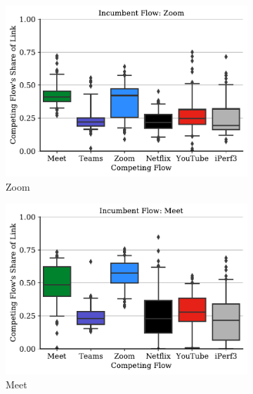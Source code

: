 \begin{figure}[t!]
\centering
\begin{subfigure}[t]{.33\textwidth}
    \centering
    \includegraphics[width=1\textwidth]{figures/comp/box_plot_zoom_dl_0.5.pdf}
    \caption{Zoom}
    \label{fig:zoom_box_1}
\end{subfigure}\hfill
\begin{subfigure}[t]{.33\textwidth}
    \centering
    \includegraphics[width=1\textwidth]{figures/comp/box_plot_meet_dl_0.5.pdf}
    \caption{Meet}
    \label{fig:zoom_box_1}
\end{subfigure}
\begin{subfigure}[t]{.33\textwidth}
    \centering

\end{subfigure}
\end{figure}
